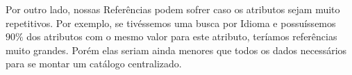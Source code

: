 \documentclass{acm_proc_article-sp}
\begin{document}
Por outro lado, nossas Referências podem sofrer caso os atributos sejam muito repetitivos. Por exemplo, se tivéssemos uma busca por Idioma e possuíssemos $90\%$ dos atributos com o mesmo valor para este atributo, teríamos referências muito grandes. Porém elas seriam ainda menores que todos os dados necessários para se montar um catálogo centralizado.

%

%
%

\end{document}
